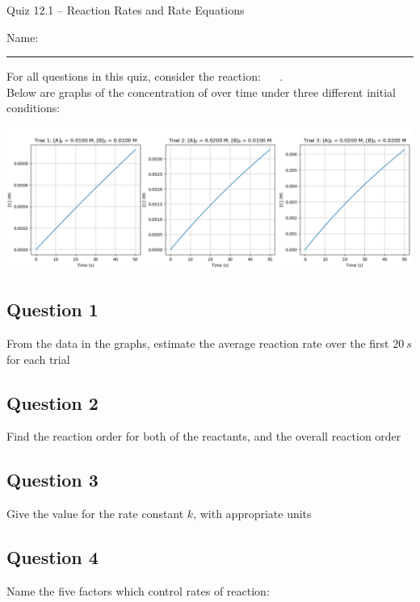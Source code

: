 \documentclass[11pt, letterpaper]{memoir}
\begin{document}
	\begin{center}
		{\large	Quiz 12.1 -- Reaction Rates and Rate Equations}
	\end{center}
	{\large Name: \rule[-1mm]{4in}{.1pt} 
	
	\noindent
	For all questions in this quiz, consider the reaction: ~~ . \\Below are graphs of the concentration of  over time under three different initial conditions:
	
	\noindent \hspace{-2em} \includegraphics[width=1.1\linewidth]{Initial_Rates} 
	
	\subsection*{Question 1}
	From the data in the graphs, estimate the average reaction rate over the first $20~s$ for each trial
	
	\vspace{5em}
	\subsection*{Question 2}
	Find the reaction order for both of the reactants, and the overall reaction order
	
	\vspace{5em}
	\subsection*{Question 3}
	Give the value for the rate constant $k$, with appropriate units
	
	\vspace{5em}
	\subsection*{Question 4}
	Name the five factors which control rates of reaction:
	
	\newpage
	\pagestyle{empty}
	\addtocounter{page}{-1}
}
\end{document}
